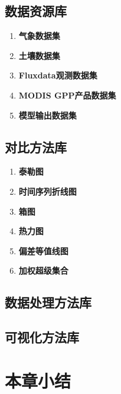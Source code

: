 \subsection{数据资源库}
\begin{enumerate}[(1)]
\item \textbf{气象数据集}

\item \textbf{土壤数据集}

\item \textbf{Fluxdata观测数据集}

\item \textbf{MODIS GPP产品数据集}

\item \textbf{模型输出数据集}

\end{enumerate}

\subsection{对比方法库}
\begin{enumerate}[(1)]
\item \textbf{泰勒图}

\item \textbf{时间序列折线图}

\item \textbf{箱图}

\item \textbf{热力图}

\item \textbf{偏差等值线图}

\item \textbf{加权超级集合}

\end{enumerate}


\subsection{数据处理方法库}

\subsection{可视化方法库}

\section{本章小结}